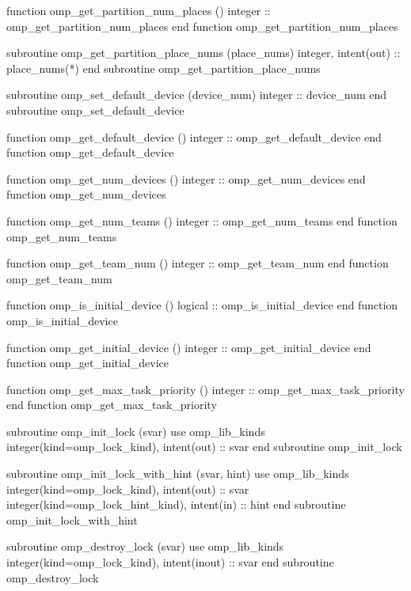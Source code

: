 {\begin{codepar}
          function omp\_get\_partition\_num\_places ()
          integer :: omp\_get\_partition\_num\_places
          end function omp\_get\_partition\_num\_places

          subroutine omp\_get\_partition\_place\_nums (place\_nums)
          integer, intent(out) :: place\_nums(*)
          end subroutine omp\_get\_partition\_place\_nums

          subroutine omp\_set\_default\_device (device\_num)
           integer :: device\_num
          end subroutine omp\_set\_default\_device

          function omp\_get\_default\_device ()
           integer :: omp\_get\_default\_device
          end function omp\_get\_default\_device

          function omp\_get\_num\_devices ()
           integer :: omp\_get\_num\_devices
          end function omp\_get\_num\_devices

          function omp\_get\_num\_teams ()
           integer :: omp\_get\_num\_teams
          end function omp\_get\_num\_teams

          function omp\_get\_team\_num ()
           integer :: omp\_get\_team\_num
          end function omp\_get\_team\_num

          function omp\_is\_initial\_device ()
           logical :: omp\_is\_initial\_device
          end function omp\_is\_initial\_device

          function omp\_get\_initial\_device ()
           integer :: omp\_get\_initial\_device
          end function omp\_get\_initial\_device

          function omp\_get\_max\_task\_priority ()
           integer :: omp\_get\_max\_task\_priority
          end function omp\_get\_max\_task\_priority

          subroutine omp\_init\_lock (svar)
           use omp\_lib\_kinds
           integer(kind=omp\_lock\_kind), intent(out) :: svar
          end subroutine omp\_init\_lock

          subroutine omp\_init\_lock\_with\_hint (svar, hint)
           use omp\_lib\_kinds
           integer(kind=omp\_lock\_kind), intent(out) :: svar
           integer(kind=omp\_lock\_hint\_kind), intent(in) :: hint
          end subroutine omp\_init\_lock\_with\_hint

          subroutine omp\_destroy\_lock (svar)
           use omp\_lib\_kinds
           integer(kind=omp\_lock\_kind), intent(inout) :: svar
          end subroutine omp\_destroy\_lock


\end{codepar}}
